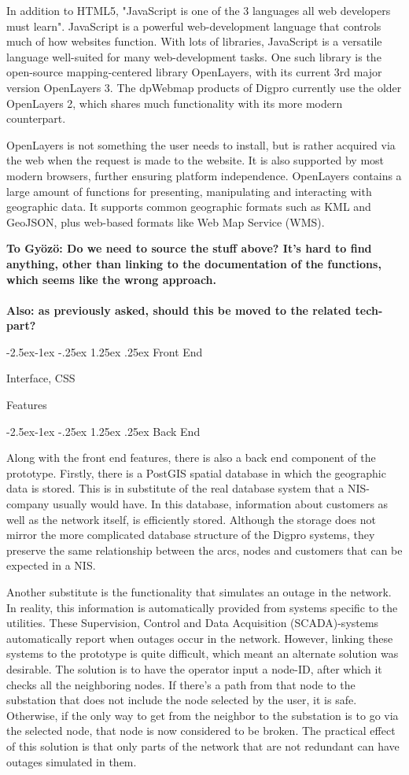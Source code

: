 \documentclass[a4paper,12pt,titlepage]{article}
\makeatletter
\newcommand\subsubsubsection{\@startsection{paragraph}{4}{\z@}%
            {-2.5ex\@plus -1ex \@minus -.25ex}%
            {1.25ex \@plus .25ex}%
            {\normalfont\normalsize\bfseries}}
\makeatother
\begin{document}
In addition to HTML5, "JavaScript is one of the 3 languages all web developers must learn"\citep{w3JS}. JavaScript is a powerful web-development language that controls much of how websites function. With lots of libraries, JavaScript is a versatile language well-suited for many web-development tasks. One such library is the open-source mapping-centered library OpenLayers, with its current 3rd major version OpenLayers 3. The dpWebmap products of Digpro currently use the older OpenLayers 2, which shares much functionality with its more modern counterpart.

OpenLayers is not something the user needs to install, but is rather acquired via the web when the request is made to the website. It is also supported by most modern browsers, further ensuring platform independence. OpenLayers contains a large amount of functions for presenting, manipulating and interacting with geographic data. It supports common geographic formats such as KML and GeoJSON, plus web-based formats like Web Map Service (WMS).

\textbf{To Gyözö: Do we need to source the stuff above? It's hard to find anything, other than linking to the documentation of the functions, which seems like the wrong approach. \\ \\ Also: as previously asked, should this be moved to the related tech-part?}

\subsubsubsection{Front End}

Interface, CSS

Features

\subsubsubsection{Back End}

Along with the front end features, there is also a back end component of the prototype. Firstly, there is a PostGIS spatial database in which the geographic data is stored. This is in substitute of the real database system that a NIS-company usually would have. In this database, information about customers as well as the network itself, is efficiently stored. Although the storage does not mirror the more complicated database structure of the Digpro systems, they preserve the same relationship between the arcs, nodes and customers that can be expected in a NIS.

Another substitute is the functionality that simulates an outage in the network. In reality, this information is automatically provided from systems specific to the utilities. These Supervision, Control and Data Acquisition (SCADA)-systems automatically report when outages occur in the network. \citep{avbrott} However, linking these systems to the prototype is quite difficult, which meant an alternate solution was desirable. The solution is to have the operator input a node-ID, after which it checks all the neighboring nodes. If there's a path from that node to the substation that does not include the node selected by the user, it is safe. Otherwise, if the only way to get from the neighbor to the substation is to go via the selected node, that node is now considered to be broken. The practical effect of this solution is that only parts of the network that are not redundant can have outages simulated in them. 
\end{document}
